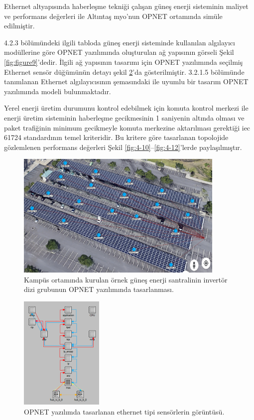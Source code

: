 Ethernet altyapısında haberleşme tekniği çalışan güneş enerji sisteminin maliyet ve performans değerleri ile Altıntaş \gls{myo}’nun OPNET ortamında simüle edilmiştir.

4.2.3 bölümündeki ilgili tabloda güneş enerji sisteminde kullanılan algılayıcı modüllerine göre OPNET yazılımında oluşturulan ağ yapısının görseli Şekil \ref{fig:figure9}'dedir. İlgili ağ yapısının tasarımı için OPNET yazılımında seçilmiş Ethernet sensör düğümünün detayı şekil \ref{fig:4-9}’da gösterilmiştir. 3.2.1.5 bölümünde tanımlanan Ethernet algılayıcısının şemasındaki ile uyumlu bir tasarım OPNET yazılımında modeli bulunmaktadır.

Yerel enerji üretim durumunu kontrol edebilmek için komuta kontrol merkezi ile enerji üretim sisteminin haberleşme gecikmesinin 1 saniyenin altında olması ve paket trafiğinin minimum gecikmeyle komuta merkezine aktarılması gerektiği \gls{iec} 61724 standardının temel kriteridir. Bu kritere göre tasarlanan topolojide gözlemlenen performans değerleri Şekil \ref{fig:4-10}--\ref{fig:4-12}’lerde paylaşılmıştır.


\begin{figure}[htbp]
\centerline{\includegraphics[width=10cm]{Resim/Sekil 4-8.png}}
\caption{Kampüs ortamında kurulan örnek güneş enerji santralinin invertör dizi grubunun OPNET yazılımında tasarlanması.}
\label{fig:4-8}
\end{figure}

\begin{figure}[htbp]


\centerline{\includegraphics[width=4cm]{Resim/Sekil4-9.png}}
\caption{OPNET yazılımda tasarlanan ethernet tipi sensörlerin görüntüsü.}
\label{fig:4-9}
\end{figure}

